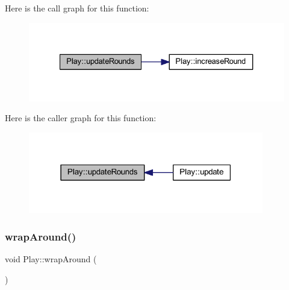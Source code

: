 Here is the call graph for this function\+:
\nopagebreak
\begin{figure}[H]
\begin{center}
\leavevmode
\includegraphics[width=327pt]{class_play_a3d795242eee0deb5e772e3cc85988829_cgraph}
\end{center}
\end{figure}
Here is the caller graph for this function\+:
\nopagebreak
\begin{figure}[H]
\begin{center}
\leavevmode
\includegraphics[width=291pt]{class_play_a3d795242eee0deb5e772e3cc85988829_icgraph}
\end{center}
\end{figure}
\mbox{\label{class_play_adaec4a516b2e9317d01d6c7fc255e7ee}} 
\subsubsection{\texorpdfstring{wrap\+Around()}{wrapAround()}}
{\footnotesize\ttfamily void Play\+::wrap\+Around (\begin{DoxyParamCaption}{ }\end{DoxyParamCaption})}

